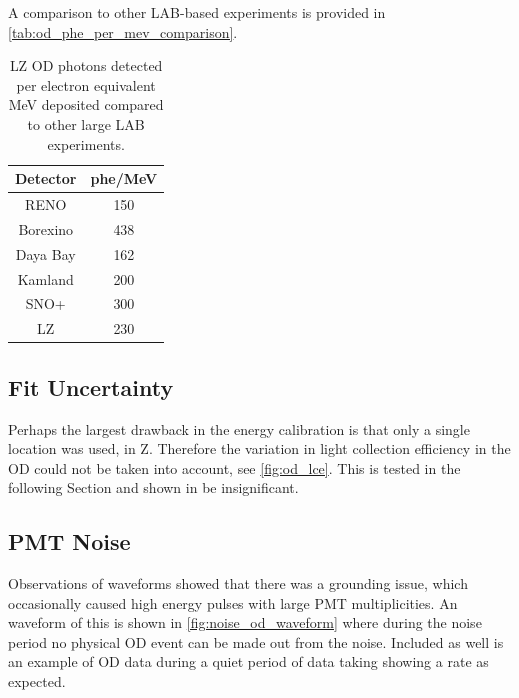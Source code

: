 

\par
A comparison to other LAB-based experiments is provided in \autoref{tab:od_phe_per_mev_comparison}.

\begin{table}[!htbp]%
    \centering
    \begin{tabular}{c|c}
        Detector & phe/MeV \\ \hline
        RENO     & 150 \cite{reno_phe_per_mev_ref} \\
        Borexino & 438 \cite{pablo_mosteiro_thesis_ref} \\
        Daya Bay & 162 \cite{dayabay_phe_per_mev_ref} \\
        Kamland  & 200 \cite{kamland_phe_per_mev_ref} \\
        SNO+     & 300 \cite{snoplus_phe_per_mev_ref} \\
        LZ       & 230 
    \end{tabular}
    \caption{LZ OD photons detected per electron equivalent MeV deposited compared to other large LAB experiments.}
    \label{tab:od_phe_per_mev_comparison}
\end{table}

\subsection{Fit Uncertainty}
\par
Perhaps the largest drawback in the energy calibration is that only a single location was used, in Z.
Therefore the variation in light collection efficiency in the OD could not be taken into account, see \autoref{fig:od_lce}.
This is tested in the following Section and shown in be insignificant.


\subsection{PMT Noise}
\par
Observations of waveforms showed that there was a grounding issue, which occasionally caused high energy pulses with large PMT multiplicities.
An waveform of this is shown in \autoref{fig:noise_od_waveform} where during the noise period no physical OD event can be made out from the noise.
Included as well is an example of OD data during a quiet period of data taking showing a rate as expected.



